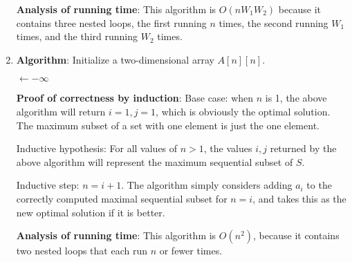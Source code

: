 \documentclass[a4paper, 10pt]{article}
\begin{document}
\begin{enumerate}
		\textbf{Analysis of running time}: This algorithm is $O(n W_1 W_2)$
		because it contains three nested loops, the first running $n$ times, the
		second running $W_1$ times, and the third running $W_2$ times.

		\newpage

	\item \textbf{Algorithm}: Initialize a two-dimensional array $A[n][n]$.

		\begin{algorithm}[h]
			\maxValue $\gets -\infty$ \;
			\Return{\maxI, \maxJ}
			\label{alg:prob4}
		\end{algorithm}

		\textbf{Proof of correctness by induction}: Base case: when $n$ is 1,
		the above algorithm will return $i = 1, j = 1$, which is obviously the
		optimal solution. The maximum subset of a set with one element is just
		the one element.

		Inductive hypothesis: For all values of $n > 1$, the values $i, j$
		returned by the above algorithm will represent the maximum sequential
		subset of $S$.

		Inductive step: $n = i + 1$. The algorithm simply considers adding $a_i$
		to the correctly computed maximal sequential subset for $n = i$, and
		takes this as the new optimal solution if it is better.

		\textbf{Analysis of running time}: This algorithm is $O(n^2)$, because
		it contains two nested loops that each run $n$ or fewer times.

\end{enumerate}
\end{document}
